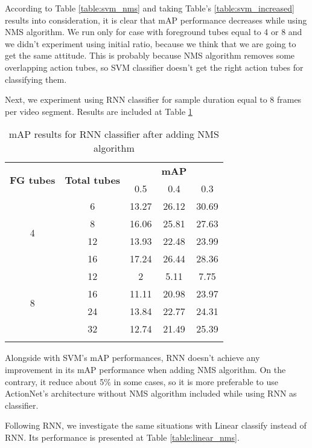 According to Table \ref{table:svm_nms} and taking Table's \ref{table:svm_increased} results into consideration, it is clear that mAP performance decreases while using NMS algorithm.
We run only for case with foreground tubes equal to 4 or 8 and we didn't experiment using initial ratio, because we think that we are going to get the same attitude.
This is probably because NMS algorithm removes some overlapping action tubes, so SVM classifier doesn't get the right action tubes for classifying them. \par

Next, we experiment using RNN classifier for sample duration equal to 8 frames per video segment. Results are included at Table \ref{table:rnn_nms}

\begin{center}
  \begin{longtable}{|| c | c || c c c ||}
    \hline
    \multirow{2}{*}{\textbf{FG tubes}} & \multirow{2}{*}{\textbf{Total tubes}} & {} & \textbf{mAP} & {} \\
    {} & {} & 0.5 & 0.4 & 0.3 \\
    \hline
    \multirow{4}{*}{4} & 6 & 13.27 & 26.12 & 30.69  \\
    \cline{2-5}
    {} & 8 & 16.06 & 25.81 & 27.63 \\
    \cline{2-5}
    {} & 12 & 13.93 & 22.48 & 23.99 \\
    \cline{2-5}
    {} & 16 & 17.24 & 26.44 & 28.36 \\
    \hline
    \multirow{4}{*}{8} & 12 & 2 & 5.11 & 7.75 \\
    \cline{2-5}
    {} & 16 & 11.11 & 20.98 & 23.97 \\
    \cline{2-5}
    {} & 24 & 13.84 & 22.77 & 24.31 \\
    \cline{2-5}
    {} & 32 & 12.74 & 21.49 & 25.39 \\
    \hline

  \caption{mAP results for RNN classifier after adding NMS algorithm}
  \label{table:rnn_nms}
\end{longtable}
\end{center}

Alongside with SVM's mAP performances, RNN doesn't achieve any improvement in its mAP performance when adding NMS algorithm. On the contrary, it reduce about 5\% in some cases, so it is more
preferable to use ActionNet's architecture without NMS algorithm included while using RNN as classifier. \par
Following RNN, we investigate the same situations with Linear classify instead of RNN. Its performance is presented at Table \ref{table:linear_nms}.

